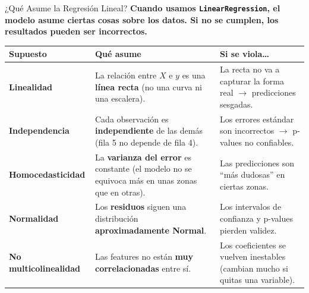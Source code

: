 \documentclass[aspectratio=169, 11pt]{beamer}
\begin{document}
\begin{frame}[shrink=8]{¿Qué Asume la Regresión Lineal?}
  \vspace{-4pt}
  {\footnotesize\color{arcaDark}\bfseries
    Cuando usamos \texttt{LinearRegression}, el modelo \textbf{asume}
    ciertas cosas sobre los datos. Si no se cumplen, los resultados
    pueden ser incorrectos.}

  \vspace{6pt}
  {\scriptsize
  \begin{tabular}{@{}lp{5.2cm}p{4.5cm}@{}}
    \toprule
    \textbf{Supuesto} & \textbf{Qué asume} & \textbf{Si se viola\ldots} \\
    \midrule
    \textbf{Linealidad} &
      La relación entre $X$ e $y$ es una \textbf{línea recta}
      (no una curva ni una escalera). &
      La recta no va a capturar la forma real $\to$
      predicciones sesgadas. \\[3pt]
    \textbf{Independencia} &
      Cada observación es \textbf{independiente} de las demás
      (fila 5 no depende de fila 4). &
      Los errores estándar son incorrectos
      $\to$ p-values no confiables. \\[3pt]
    \textbf{Homocedasticidad} &
      La \textbf{varianza del error} es constante
      (el modelo no se equivoca más en unas zonas que en otras). &
      Las predicciones son ``más dudosas'' en ciertas zonas. \\[3pt]
    \textbf{Normalidad} &
      Los \textbf{residuos} siguen una distribución
      \textbf{aproximadamente Normal}. &
      Los intervalos de confianza y p-values pierden validez. \\[3pt]
    \textbf{No multicolinealidad} &
      Las features no están \textbf{muy correlacionadas} entre sí. &
      Los coeficientes se vuelven inestables
      (cambian mucho si quitas una variable). \\
    \bottomrule
  \end{tabular}
  }
\end{frame}
\end{document}
